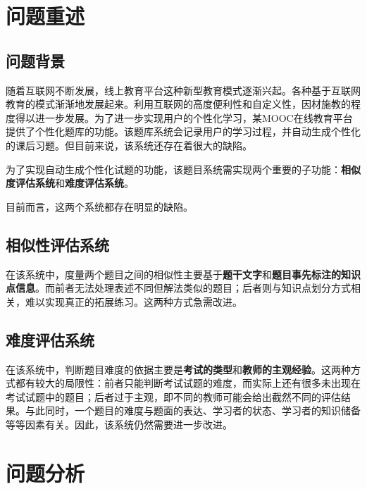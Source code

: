 \setcounter{page}{1}    %

%
%

\section{问题重述}

\subsection{问题背景}

随着互联网不断发展，线上教育平台这种新型教育模式逐渐兴起。各种基于互联网教育的模式渐渐地发展起来。利用互联网的高度便利性和自定义性，因材施教的程度得以进一步发展。为了进一步实现用户的个性化学习，某\linebreak MOOC在线教育平台提供了个性化题库的功能。该题库系统会记录用户的学习过程，并自动生成个性化的课后习题。但目前来说，该系统还存在着很大的缺陷。

为了实现自动生成个性化试题的功能，该题目系统需实现两个重要的子功能：\textbf{相似度评估系统}和\textbf{难度评估系统}。

目前而言，这两个系统都存在明显的缺陷。

\subsection{相似性评估系统}

在该系统中，度量两个题目之间的相似性主要基于\textbf{题干文字}和\textbf{题目事先标注的知识点信息}。而前者无法处理表述不同但解法类似的题目；后者则与知识点划分方式相关，难以实现真正的拓展练习。这两种方式急需改进。

\subsection{难度评估系统}

在该系统中，判断题目难度的依据主要是\textbf{考试的类型}和\textbf{教师的主观经验}。这两种方式都有较大的局限性：前者只能判断考试试题的难度，而实际上还有很多未出现在考试试题中的题目；后者过于主观，即不同的教师可能会给出截然不同的评估结果。与此同时，一个题目的难度与题面的表达、学习者的状态、学习者的知识储备等等因素有关。因此，该系统仍然需要进一步改进。

\section{问题分析}


